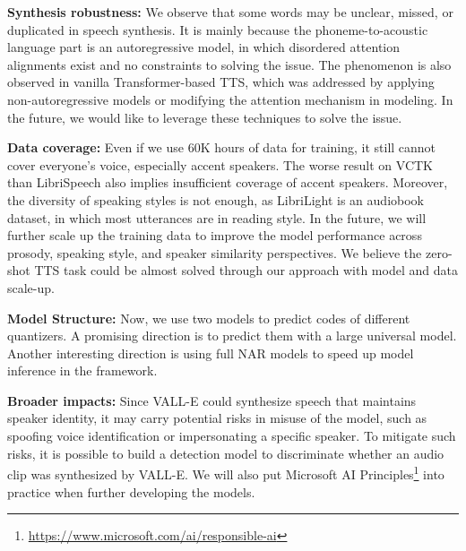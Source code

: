 \documentclass{article}
\theoremstyle{plain}
\theoremstyle{definition}
\theoremstyle{remark}
\newcommand\our{\textsc{VALL-E}}
\begin{document}
\textbf{Synthesis robustness:} We observe that some words may be unclear, missed, or duplicated in speech synthesis. It is mainly because the phoneme-to-acoustic language part is an autoregressive model, in which disordered attention alignments exist and no constraints to solving the issue. The phenomenon is also observed in vanilla Transformer-based TTS, which was addressed by applying non-autoregressive models or modifying the attention mechanism in modeling. In the future, we would like to leverage these techniques to solve the issue. 

\textbf{Data coverage:} Even if we use 60K hours of data for  training, it still cannot cover everyone's voice, especially accent speakers. The worse result on VCTK than LibriSpeech also implies  insufficient coverage of accent speakers.  Moreover, the  diversity of speaking styles is not enough, as LibriLight is an audiobook dataset, in which most utterances are in reading style.  In the future, we will further scale up the training data to improve the model performance across prosody, speaking style, and speaker similarity perspectives. We believe the zero-shot TTS task could be almost solved through our approach with model and data scale-up. 

\textbf{Model Structure:} Now, we use two models to predict codes of different quantizers. A promising direction is to predict them with a large universal model. Another interesting direction  is using full NAR models to speed up model inference  in the framework. 


\textbf{Broader impacts:} Since \our{} could synthesize speech that maintains speaker identity, it may carry potential risks in misuse of the model, such as spoofing voice identification or impersonating a specific speaker. To mitigate such risks, it is possible to build a detection model to discriminate whether an audio clip was synthesized by \our{}. We will also put Microsoft AI Principles\footnote{\url{ https://www.microsoft.com/ai/responsible-ai}} into practice when further developing the models.





\end{document}
